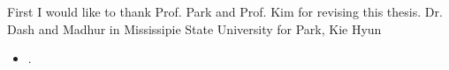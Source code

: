 \begin{acknowledgements}
First I would like to thank Prof. Park and Prof. Kim for revising this thesis. 
Dr. Dash and Madhur in Mississipie State University for 
Park, Kie Hyun
\end{acknowledgements}

\begin{researches}
\begin{itemize}
\item{.}
\end{itemize}
\end{researches}